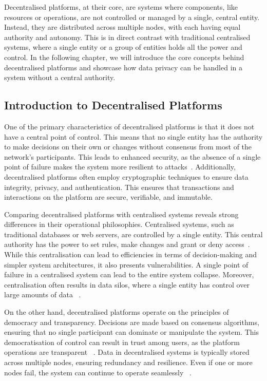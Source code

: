 Decentralised platforms, at their core, are systems where components, like resources or operations, are not controlled or managed by a single, central entity. Instead, they are distributed across multiple nodes, with each having equal authority and autonomy. This is in direct contrast with traditional centralised systems, where a single entity or a group of entities holds all the power and control. In the following chapter, we will introduce the core concepts behind decentralised platforms and showcase how data privacy can be handled in a system without a central authority.


\subsection{Introduction to Decentralised Platforms}

One of the primary characteristics of decentralised platforms is that it does not have a central point of control. This means that no single entity has the authority to make decisions on their own or changes without consensus from most of the network's participants. This leads to enhanced security, as the absence of a single point of failure makes the system more resilient to attacks~\cite{Maffiola.2022}. Additionally, decentralised platforms often employ cryptographic techniques to ensure data integrity, privacy, and authentication. This ensures that transactions and interactions on the platform are secure, verifiable, and immutable.

Comparing decentralised platforms with centralised systems reveals strong differences in their operational philosophies. Centralised systems, such as traditional databases or web servers, are controlled by a single entity. This central authority has the power to set rules, make changes and grant or deny access~\cite{Maffiola.2022}. While this centralisation can lead to efficiencies in terms of decision-making and simpler system architectures, it also presents vulnerabilities. A single point of failure in a centralised system can lead to the entire system collapse. Moreover, centralisation often results in data silos, where a single entity has control over large amounts of data ~\cite{Ramachandran2022}.

On the other hand, decentralised platforms operate on the principles of democracy and transparency. Decisions are made based on consensus algorithms, ensuring that no single participant can dominate or manipulate the system. This democratisation of control can result in trust among users, as the platform operations are transparent ~\cite{Hasan.2022}. Data in decentralised systems is typically stored across multiple nodes, ensuring redundancy and resilience. Even if one or more nodes fail, the system can continue to operate seamlessly ~\cite{Ramachandran2022}.

